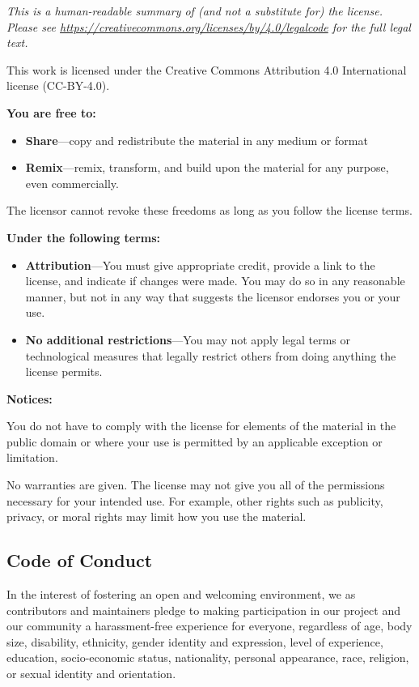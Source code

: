\emph{This is a human-readable summary of (and not a substitute for) the
license. Please see
\url{https://creativecommons.org/licenses/by/4.0/legalcode} for the full
legal text.}

This work is licensed under the Creative Commons Attribution 4.0
International license (CC-BY-4.0).

\textbf{You are free to:}

\begin{itemize}
\item
  \textbf{Share}---copy and redistribute the material in any medium or
  format
\item
  \textbf{Remix}---remix, transform, and build upon the material for any
  purpose, even commercially.
\end{itemize}

The licensor cannot revoke these freedoms as long as you follow the
license terms.

\textbf{Under the following terms:}

\begin{itemize}
\item
  \textbf{Attribution}---You must give appropriate credit, provide a
  link to the license, and indicate if changes were made. You may do so
  in any reasonable manner, but not in any way that suggests the
  licensor endorses you or your use.
\item
  \textbf{No additional restrictions}---You may not apply legal terms or
  technological measures that legally restrict others from doing
  anything the license permits.
\end{itemize}

\textbf{Notices:}

You do not have to comply with the license for elements of the material
in the public domain or where your use is permitted by an applicable
exception or limitation.

No warranties are given. The license may not give you all of the
permissions necessary for your intended use. For example, other rights
such as publicity, privacy, or moral rights may limit how you use the
material.

\hypertarget{s:conduct}{\subsection{Code of Conduct}\label{s:conduct}}

In the interest of fostering an open and welcoming environment, we as
contributors and maintainers pledge to making participation in our
project and our community a harassment-free experience for everyone,
regardless of age, body size, disability, ethnicity, gender identity and
expression, level of experience, education, socio-economic status,
nationality, personal appearance, race, religion, or sexual identity and
orientation.

